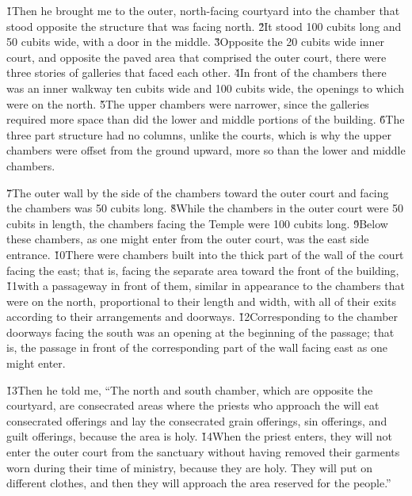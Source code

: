 \v{1}Then he brought me to the outer, north-facing courtyard into the chamber that stood opposite the structure that was facing north. \v{2}It stood 100 cubits long and 50 cubits wide, with a door in the middle. \v{3}Opposite the 20 cubits wide inner court, and opposite the paved area that comprised the outer court, there were three stories of galleries that faced each other. \v{4}In front of the chambers there was an inner walkway ten cubits wide and 100 cubits wide, the openings to which were on the north. \v{5}The upper chambers were narrower, since the galleries required more space than did the lower and middle portions of the building. \v{6}The three part structure had no columns, unlike the courts, which is why the upper chambers were offset from the ground upward, more so than the lower and middle chambers.

\v{7}The outer wall by the side of the chambers toward the outer court and facing the chambers was 50 cubits long. \v{8}While the chambers in the outer court were 50 cubits in length, the chambers facing the Temple were 100 cubits long. \v{9}Below these chambers, as one might enter from the outer court, was the east side entrance. \v{10}There were chambers built into the thick part of the wall of the court facing the east; that is, facing the separate area toward the front of the building, \v{11}with a passageway in front of them, similar in appearance to the chambers that were on the north, proportional to their length and width, with all of their exits according to their arrangements and doorways. \v{12}Corresponding to the chamber doorways facing the south was an opening at the beginning of the passage; that is, the passage in front of the corresponding part of the wall facing east as one might enter.

\v{13}Then he told me, ``The north and south chamber, which are opposite the courtyard, are consecrated areas where the priests who approach the  will eat consecrated offerings and lay the consecrated grain offerings, sin offerings, and guilt offerings, because the area is holy. \v{14}When the priest enters, they will not enter the outer court from the sanctuary without having removed their garments worn during their time of ministry, because they are holy. They will put on different clothes, and then they will approach the area reserved for the people.''

